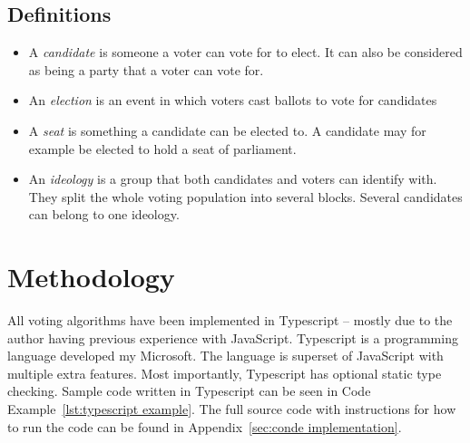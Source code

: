 \documentclass[12pt]{article}
\begin{document}
\subsection{Definitions}
\begin{itemize}
	\item A \textit{candidate} is someone a voter can vote for to elect. It can also be considered as being a party that a voter can vote for.
	\item An \textit{election} is an event in which voters cast ballots to vote for candidates
	\item A \textit{seat} is something a candidate can be elected to. A candidate may for example be elected to hold a seat of parliament.
	\item An \textit{ideology} is a group that both candidates and voters can identify with. They split the whole voting population into several blocks. Several candidates can belong to one ideology.
\end{itemize}  
\section{Methodology}
All voting algorithms have been implemented in Typescript – mostly due to the author having previous experience with JavaScript. Typescript is a programming language developed my Microsoft. The language is superset of JavaScript with multiple extra features. Most importantly, Typescript has optional static type checking. Sample code written in Typescript can be seen in Code Example~\ref{lst:typescript example}. The full source code with instructions for how to run the code can be found in Appendix~\ref{sec:conde implementation}.
\end{document}
